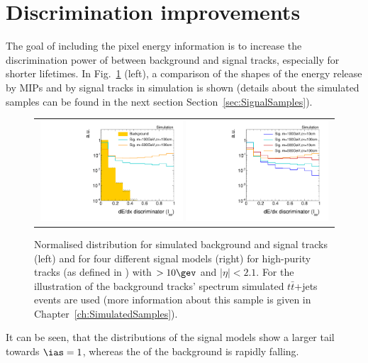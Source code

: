 \section{Discrimination improvements}
\label{sec:DiscriminationImprovements}
The goal of including the pixel energy information is to increase the discrimination power of \ias between background and signal tracks, especially for shorter lifetimes.
In Fig.~\ref{fig:MIPs-Signal-Dedx} (left), a comparison of the shapes of the energy release by MIPs and by signal tracks in simulation is shown (details about the simulated samples can be found in the next section Section~\ref{sec:SignalSamples}).
\begin{figure}[!t]
  \centering 
  \begin{tabular}{c}
    \includegraphics[width=0.49\textwidth]{figures/analysis_2/PixelCalibration/htrackASmiSmallRange_log_chiTracksGoodQualitySelection_2Signal_ttjets.pdf}   
    \includegraphics[width=0.49\textwidth]{figures/analysis_2/PixelCalibration/htrackASmiSmallRange_log_chiTracksGoodQualitySelection_4Signal.pdf}
  \end{tabular}
  \caption{Normalised \ias distribution for simulated background and signal tracks (left) and for four different signal models (right) 
           for high-purity tracks (as defined in \cite{bib:CMS:Tracking_2010}) with \pt$>10\gev$ and $|\eta|<2.1$.
           For the illustration of the background tracks' spectrum simulated $t\bar{t}$+jets events are used (more information about this sample is given in Chapter~\ref{ch:SimulatedSamples}).}
  \label{fig:MIPs-Signal-Dedx}
\end{figure} 
It can be seen, that the \ias distributions of the signal models show a larger tail towards $\ias=1$, whereas the \ias of the background is rapidly falling.

